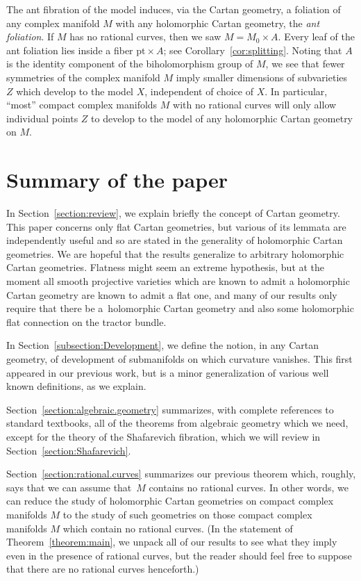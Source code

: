 \documentclass[10pt,a4paper]{amsart}
\numberwithin{equation}{section}
\begin{document}
The ant fibration of the model induces, via the Cartan geometry, a foliation of any complex manifold $M$ with any holomorphic Cartan
geometry, the \emph{ant foliation}. If $M$ has no rational curves, then we saw $M = M_0\times A$. Every leaf of the ant foliation lies
inside a fiber $\text{pt}\times A$; see Corollary~\ref{cor:splitting}. Noting that $A$ is the identity component of the
biholomorphism group of $M$, we see that fewer symmetries of the complex manifold $M$ imply smaller dimensions of subvarieties~$Z$
which develop to the model $X$, independent of choice of $X$. In particular, ``most'' compact complex manifolds $M$ with no rational
curves will only allow individual points $Z$ to develop to the model of any holomorphic Cartan geometry on $M$.



\section{Summary of the paper}

In Section~\ref{section:review}, we explain briefly the concept of Cartan geometry. This paper concerns only flat Cartan geometries, but
various of its lemmata are independently useful and so are stated in the generality of holomorphic Cartan geometries. We are hopeful that
the results generalize to arbitrary holomorphic Cartan geometries. Flatness might seem an extreme hypothesis, but at the moment all smooth
projective varieties which are known to admit a holomorphic Cartan geometry are known to admit a flat one, and many of our results only
require that there be a~holomorphic Cartan geometry and also some holomorphic flat connection on the tractor bundle.

In Section~\ref{subsection:Development}, we define the notion, in any Cartan geometry, of development of submanifolds on which curvature vanishes.
This first appeared in our previous work, but is a minor generalization of various well known definitions, as we explain.

Section~\ref{section:algebraic.geometry} summarizes, with complete references to standard textbooks, all of the theorems from algebraic geometry which we need, except for the theory of the Shafarevich fibration, which we will review in Section~\ref{section:Shafarevich}.

Section~\ref{section:rational.curves} summarizes our previous theorem which, roughly, says that we can assume that~$M$ contains no rational curves.
In other words, we can reduce the study of holomorphic Cartan geometries on
compact complex manifolds $M$ to the study of such geometries on those compact complex manifolds $M$ which contain no rational curves.
(In the statement of Theorem~\ref{theorem:main}, we unpack all of our results to see what they imply even in the presence of rational
curves, but the reader should feel free to suppose that there are no rational curves henceforth.)
\end{document}
